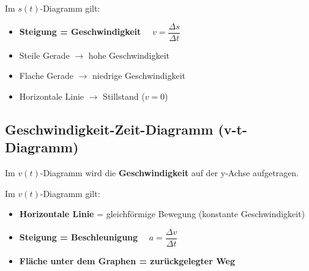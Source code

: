 \documentclass[11pt,a4paper]{article}
\begin{document}
\begin{merksatz}
Im $s(t)$-Diagramm gilt:
\begin{itemize}
\item \textbf{Steigung = Geschwindigkeit} $\quad v = \dfrac{\Delta s}{\Delta t}$
\item Steile Gerade $\rightarrow$ hohe Geschwindigkeit
\item Flache Gerade $\rightarrow$ niedrige Geschwindigkeit
\item Horizontale Linie $\rightarrow$ Stillstand ($v = 0$)
\end{itemize}
\end{merksatz}

\subsection{Geschwindigkeit-Zeit-Diagramm (v-t-Diagramm)}

Im $v(t)$-Diagramm wird die \textbf{Geschwindigkeit} auf der y-Achse aufgetragen.

\begin{center}
\end{center}

\begin{merksatz}
Im $v(t)$-Diagramm gilt:
\begin{itemize}
\item \textbf{Horizontale Linie} = gleichförmige Bewegung (konstante Geschwindigkeit)
\item \textbf{Steigung = Beschleunigung} $\quad a = \dfrac{\Delta v}{\Delta t}$
\item \textbf{Fläche unter dem Graphen = zurückgelegter Weg}
\end{itemize}
\end{merksatz}
\end{document}
